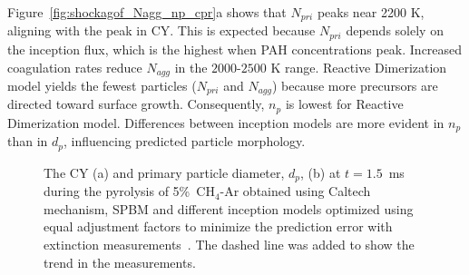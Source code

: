 Figure~\ref{fig:shockagof_Nagg_np_cpr}a shows that $N_{pri}$ peaks near 2200 K, aligning with the peak in CY. This is expected because $N_{pri}$ depends solely on the inception flux, which is the highest when PAH concentrations peak. Increased coagulation rates reduce $N_{agg}$ in the $2000$-$2500$ K range. Reactive Dimerization model yields the fewest particles ($N_{pri}$ and $N_{agg}$) because more precursors are directed toward surface growth. Consequently, $n_p$ is lowest for Reactive Dimerization model. Differences between inception models are more evident in $n_p$ than in $d_p$, influencing predicted particle morphology.

\begin{figure}[H]
	\centering
	\caption{The CY (a) and primary particle diameter, $d_p$, (b) at $t=1.5$~ms during the pyrolysis of 5\%~$\mathrm{CH_4}$-Ar obtained using Caltech mechanism, SPBM and different inception models optimized using equal adjustment factors to minimize the prediction error with extinction measurements~\citep{agafonov2016unified}. The dashed line was added to show the trend in the measurements.}
	\label{fig:shockagof_yield_dp_cpr} 
\end{figure}


